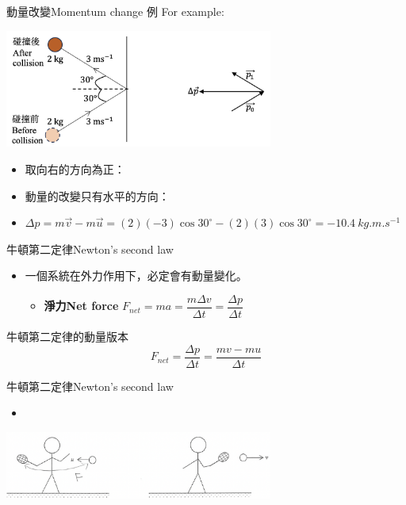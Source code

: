 \documentclass[beamer=true]{standalone}
\begin{document}
\begin{frame}{動量改變Momentum change}
    例 For example:
    {\par\centering
    \includegraphics[width=0.66\textwidth]{assets/4c46ae9d.png}
    \par}
    \begin{itemize}
        \item 取向右的方向為正：
        \item 動量的改變只有水平的方向：
        \item[] $\Delta p=m\vec{v}-m\vec{u}=(2)(-3)\cos 30^\circ-(2)(3)\cos 30^\circ=\qty{-10.4}{kg.m.s^{-1}}$
    \end{itemize}
\end{frame}

\begin{frame}{牛頓第二定律Newton's second law}
    \begin{itemize}
        \item 一個系統在外力作用下，必定會有動量變化。
              \begin{itemize}
                  \item [] \textbf{淨力Net force} $F_{net}=ma=\dfrac{m\Delta v}{\Delta t}=\dfrac{\Delta p}{\Delta t}$
              \end{itemize}
    \end{itemize}
    \begin{alertblock}
        {牛頓第二定律的動量版本}
        \begin{equation}
            F_{net}=\frac{\Delta p}{\Delta t}=\frac{mv-mu}{\Delta t}
        \end{equation}
    \end{alertblock}
\end{frame}

\begin{frame}{牛頓第二定律Newton's second law}
    \begin{itemize}
        \item[] 
    \end{itemize}
    {\par\centering
    \includegraphics[width=0.66\textwidth]{assets/bc5b866b.png}
    \par}
\end{frame}
\end{document}
